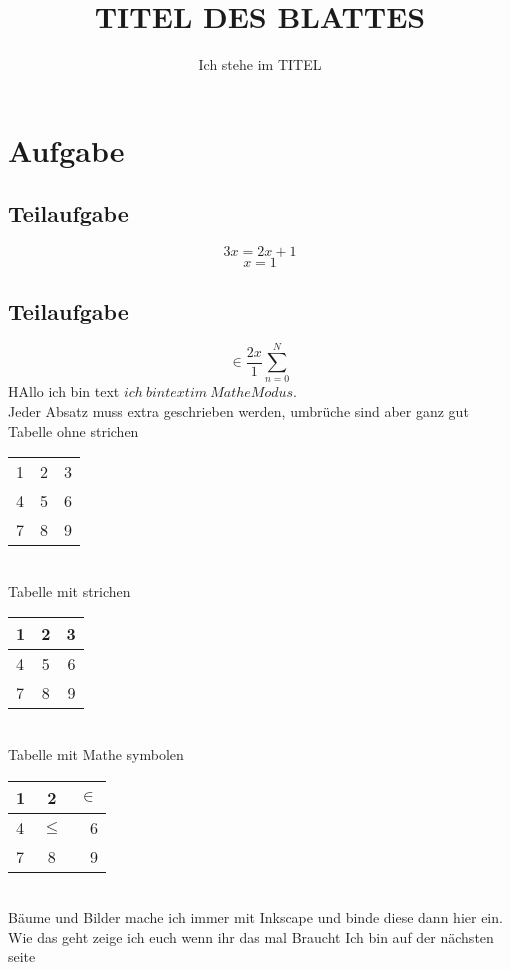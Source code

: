 \documentclass{scrartcl}
\author{Ich stehe im TITEL}
\title{TITEL DES BLATTES }
\begin{document}
\maketitle %
\section{Aufgabe}
\subsection{Teilaufgabe}
\[ 3x = 2x +1\]
\[ x = 1 \]
\subsection{Teilaufgabe}
\[ \in \frac{2x}{1}  \sum_{n=0}^N  \] 
HAllo ich bin text $ich\ bin text im\ Mathe Modus.$ \\
Jeder Absatz muss extra geschrieben werden, umbrüche sind aber ganz gut \\
Tabelle ohne strichen \\
\begin{tabular}{ l c r }
  1 & 2 & 3 \\
  4 & 5 & 6 \\
  7 & 8 & 9 \\
\end{tabular}
\\
Tabelle mit strichen
\begin{tabular}{ l| c| r }
  1 & 2 & 3 \\ \hline
  4 & 5 & 6 \\ \hline
  7 & 8 & 9 \\
\end{tabular}
\\
Tabelle mit Mathe symbolen 
\begin{tabular}{ l | c | r }
  1 & 2 & $\in$ \\ \hline
  4 & $\leq$ & 6 \\ \hline
  7 & 8 & 9 \\ 
\end{tabular}
\\
Bäume und Bilder mache ich immer mit Inkscape und binde diese dann hier ein. Wie das geht zeige ich euch wenn ihr das mal Braucht
\newpage
Ich bin auf der nächsten seite
\end{document}
